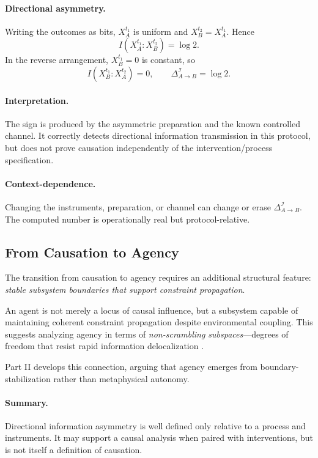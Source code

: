 \documentclass[12pt,a4paper,openany]{book}
\begin{document}
\paragraph{Directional asymmetry.}
Writing the outcomes as bits, $X_A^{t_1}$ is uniform and $X_B^{t_2}=X_A^{t_1}$.  Hence
\begin{equation}
I(X_A^{t_1}:X_B^{t_2})=\log2.
\end{equation}
In the reverse arrangement, $X_B^{t_1}=0$ is constant, so
\begin{equation}
I(X_B^{t_1}:X_A^{t_2})=0,
\qquad
\Delta_{A\to B}^{\mathcal I}=\log2.
\end{equation}

\paragraph{Interpretation.}
The sign is produced by the asymmetric preparation and the known controlled channel.  It correctly detects directional information transmission in this protocol, but does not prove causation independently of the intervention/process specification.

\paragraph{Context-dependence.}
Changing the instruments, preparation, or channel can change or erase $\Delta_{A\to B}^{\mathcal I}$.  The computed number is operationally real but protocol-relative.

\subsection{From Causation to Agency}
\label{C-sec:I.6}

The transition from causation to agency requires an additional structural feature: \emph{stable subsystem boundaries that support constraint propagation}.

An agent is not merely a locus of causal influence, but a subsystem capable of maintaining coherent constraint propagation despite environmental coupling. This suggests analyzing agency in terms of \emph{non-scrambling subspaces}—degrees of freedom that resist rapid information delocalization \cite{Hayden2007}.

Part II develops this connection, arguing that agency emerges from boundary-stabilization rather than metaphysical autonomy.

\paragraph{Summary.} Directional information asymmetry is well defined only relative to a process and instruments.  It may support a causal analysis when paired with interventions, but is not itself a definition of causation.
\end{document}
